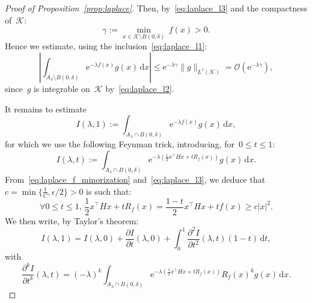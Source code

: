 \documentclass[10pt]{article}
\renewcommand{\d}{\mathrm{d}}
\newcommand{\e}{\mathrm{e}}
\newcommand{\1}{\mathbbm 1}
\renewcommand{\O}{\mathcal{O}}
\begin{document}
\begin{proof}[Proof of Proposition~\ref{prop:laplace}]
            Then, by~\eqref{eq:laplace_l3} and the compactness of~$\mathcal K$:
            \begin{equation}
                \label{eq:laplace_def_gamma}
                \gamma := \underset{x\in \mathcal K\setminus B(0,\delta)}{\min}\, f(x)> 0.
            \end{equation}
            Hence we estimate, using the inclusion~\eqref{eq:laplace_l1}:
            \begin{equation}
                \left|\int_{A_\lambda \setminus B(0,\delta)} \e^{-\lambda f(x)}g(x)\,\d x\right| \leq \e^{-\lambda \gamma} \|g\|_{L^1(\mathcal K)} = \O(\e^{-\lambda\gamma}),
            \end{equation}
            since~$g$ is integrable on~$\mathcal K$ by~\eqref{eq:laplace_l2}.

            It remains to estimate
            \begin{equation}
                I(\lambda,1) := \int_{A_\lambda \cap B(0,\delta)} \e^{-\lambda f(x)}g(x)\,\d x,
            \end{equation}
            for which we use the following Feynman trick, introducing, for~$0\leq t\leq 1$:
            \begin{equation}
                I(\lambda,t) := \int_{A_\lambda \cap B(0,\delta)} \e^{-\lambda\left(\frac12 x^\intercal H x + t R_f(x)\right)}g(x)\,\d x.
            \end{equation}
            From~\eqref{eq:laplace_f_minorization} and~\eqref{eq:laplace_l3}, we deduce that~$c = \min\{\frac1C,\epsilon/2\}>0$ is such that:
            \begin{equation}
                \label{eq:laplace_interpolation_positivity}
                \forall 0\leq t\leq 1,\,\frac 12x^\intercal H x + t R_f(x) = \frac{1-t}2x^\intercal H x + tf(x) \geq c|x|^2.
            \end{equation}
            We then write, by Taylor's theorem:
            \begin{equation}
                I(\lambda,1) = I(\lambda,0) + \frac{\partial I}{\partial t}(\lambda,0)  + \int_0^1 \frac{\partial^2 I}{\partial t^2}(\lambda,t)(1-t)\,\d t,
            \end{equation}
            with
            \begin{equation}
                \frac{\partial^k I}{\partial t^k}(\lambda, t) = (-\lambda)^k\int_{A_\lambda \cap B(0,\delta)} \e^{-\lambda\left(\frac12x^\intercal H x +tR_f(x)\right)}R_f(x)^k g(x)\,\d x.

\end{equation}
\end{proof}
\end{document}
